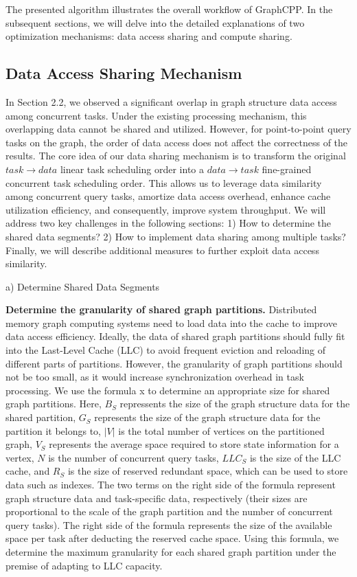 \documentclass[lettersize,journal]{IEEEtran} %
\begin{document}
The presented algorithm illustrates the overall workflow of GraphCPP. In the subsequent sections, we will delve into the detailed explanations of two optimization mechanisms: data access sharing and compute sharing.

\subsection{Data Access Sharing Mechanism}
In Section 2.2, we observed a significant overlap in graph structure data access among concurrent tasks. Under the existing processing mechanism, this overlapping data cannot be shared and utilized. However, for point-to-point query tasks on the graph, the order of data access does not affect the correctness of the results. The core idea of our data sharing mechanism is to transform the original $task \rightarrow data$ linear task scheduling order into a $data \rightarrow task$ fine-grained concurrent task scheduling order. This allows us to leverage data similarity among concurrent query tasks, amortize data access overhead, enhance cache utilization efficiency, and consequently, improve system throughput. We will address two key challenges in the following sections: 1) How to determine the shared data segments? 2) How to implement data sharing among multiple tasks? Finally, we will describe additional measures to further exploit data access similarity.

a) Determine Shared Data Segments

{\bf{Determine the granularity of shared graph partitions.}} Distributed memory graph computing systems need to load data into the cache to improve data access efficiency. Ideally, the data of shared graph partitions should fully fit into the Last-Level Cache (LLC) to avoid frequent eviction and reloading of different parts of partitions. However, the granularity of graph partitions should not be too small, as it would increase synchronization overhead in task processing. We use the formula x to determine an appropriate size for shared graph partitions. Here, $B_S$ repressents the size of the graph structure data for the shared partition, $G_S$ represents the size of the graph structure data for the partition it belongs to, $|V|$ is the total number of vertices on the partitioned graph, $V_S$ represents the average space required to store state information for a vertex, $N$ is the number of concurrent query tasks, $LLC_S$ is the size of the LLC cache, and $R_S$ is the size of reserved redundant space,  which can be used to store data such as indexes. The two terms on the right side of the formula represent graph structure data and task-specific data, respectively (their sizes are proportional to the scale of the graph partition and the number of concurrent query tasks). The right side of the formula represents the size of the available space per task after deducting the reserved cache space. Using this formula, we determine the maximum granularity for each shared graph partition under the premise of adapting to LLC capacity.
\end{document}
